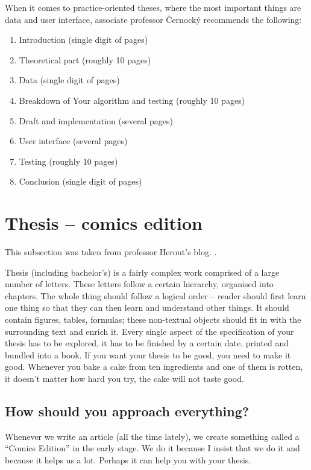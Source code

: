 When it comes to practice-oriented theses, where the most important things are data and user interface, associate professor Černocký \cite{Cernocky} recommends the following:
\begin{enumerate}
\item Introduction (single digit of pages)
\item Theoretical part (roughly 10 pages)
\item Data (single digit of pages)
\item Breakdown of Your algorithm and testing (roughly 10 pages)
\item Draft and implementation (several pages)
\item User interface (several pages)
\item Testing (roughly 10 pages)
\item Conclusion (single digit of pages)
\end{enumerate}

\section{Thesis -- comics edition}

This subsection was taken from professor Herout's blog. \cite{Herout}.

Thesis (including bachelor's) is a fairly complex work comprised of a large number of letters. These letters follow a certain hierarchy, organised into chapters. The whole thing should follow a logical order -- reader should first learn one thing so that they can then learn and understand other things. It should contain figures, tables, formulas; these non-textual objects should fit in with the surrounding text and enrich it. Every single aspect of the specification of your thesis has to be explored, it has to be finished by a certain date, printed and bundled into a book. If you want your thesis to be good, you need to make it good. Whenever you bake a cake from ten ingredients and one of them is rotten, it doesn't matter how hard you try, the cake will not taste good.

\subsection*{How should you approach everything?}

Whenever we write an article (all the time lately), we create something called a ``Comics Edition'' in the early stage. We do it because I insist that we do it and because it helps us a lot. Perhaps it can help you with your thesis.

